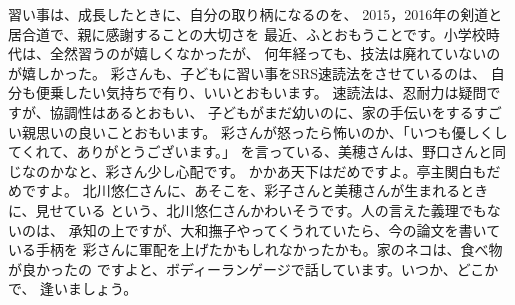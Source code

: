 \documentclass{jsarticle}
\begin{document}
\title{}
\author{}
\date{}
\maketitle

   習い事は、成長したときに、自分の取り柄になるのを、
   2015，2016年の剣道と居合道で、親に感謝することの大切さを
   最近、ふとおもうことです。小学校時代は、全然習うのが嬉しくなかったが、
   何年経っても、技法は廃れていないのが嬉しかった。
   彩さんも、子どもに習い事をSRS速読法をさせているのは、
   自分も便乗したい気持ちで有り、いいとおもいます。
   速読法は、忍耐力は疑問ですが、協調性はあるとおもい、
   子どもがまだ幼いのに、家の手伝いをするすごい親思いの良いことおもいます。
   彩さんが怒ったら怖いのか、「いつも優しくしてくれて、ありがとうございます。」
   を言っている、美穂さんは、野口さんと同じなのかなと、彩さん少し心配です。
   かかあ天下はだめですよ。亭主関白もだめですよ。
   北川悠仁さんに、あそこを、彩子さんと美穂さんが生まれるときに、見せている
   という、北川悠仁さんかわいそうです。人の言えた義理でもないのは、
   承知の上ですが、大和撫子やってくうれていたら、今の論文を書いている手柄を
   彩さんに軍配を上げたかもしれなかったかも。家のネコは、食べ物が良かったの
   ですよと、ボディーランゲージで話しています。いつか、どこかで、
   逢いましょう。
\end{document}
